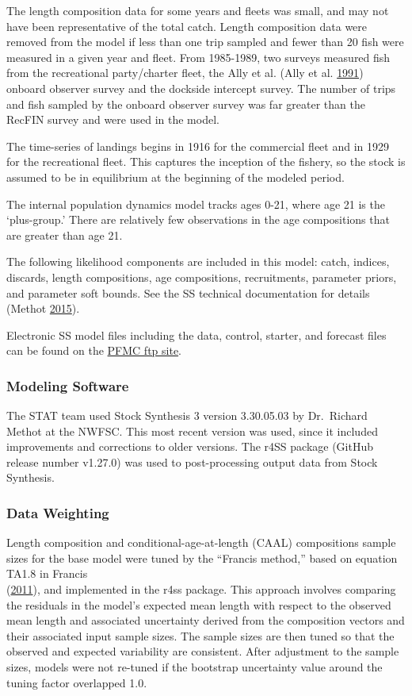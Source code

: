 \documentclass[12pt,]{article}
\begin{document}
The length composition data for some years and fleets was small, and may
not have been representative of the total catch. Length composition data
were removed from the model if less than one trip sampled and fewer than
20 fish were measured in a given year and fleet. From 1985-1989, two
surveys measured fish from the recreational party/charter fleet, the
Ally et al. (Ally et al. \protect\hyperlink{ref-Ally1991}{1991}) onboard
observer survey and the dockside intercept survey. The number of trips
and fish sampled by the onboard observer survey was far greater than the
RecFIN survey and were used in the model.

The time-series of landings begins in 1916 for the commercial fleet and
in 1929 for the recreational fleet. This captures the inception of the
fishery, so the stock is assumed to be in equilibrium at the beginning
of the modeled period.

The internal population dynamics model tracks ages 0-21, where age 21 is
the `plus-group.' There are relatively few observations in the age
compositions that are greater than age 21.

The following likelihood components are included in this model: catch,
indices, discards, length compositions, age compositions, recruitments,
parameter priors, and parameter soft bounds. See the SS technical
documentation for details (Methot
\protect\hyperlink{ref-Methot2015}{2015}).

Electronic SS model files including the data, control, starter, and
forecast files can be found on the
\href{ftp://ftp.pcouncil.org/pub/GF_STAR3_2017_Blue_Deacon_CAScorp/}{PFMC
ftp site}.

\subsubsection{Modeling Software}\label{modeling-software}

The STAT team used Stock Synthesis 3 version 3.30.05.03 by Dr.~Richard
Methot at the NWFSC. This most recent version was used, since it
included improvements and corrections to older versions. The r4SS
package (GitHub release number v1.27.0) was used to post-processing
output data from Stock Synthesis.

\subsubsection{Data Weighting}\label{data-weighting}

Length composition and conditional-age-at-length (CAAL) compositions
sample sizes for the base model were tuned by the ``Francis method,''
based on equation TA1.8 in Francis\\
(\protect\hyperlink{ref-Francis2011}{2011}), and implemented in the r4ss
package. This approach involves comparing the residuals in the model's
expected mean length with respect to the observed mean length and
associated uncertainty derived from the composition vectors and their
associated input sample sizes. The sample sizes are then tuned so that
the observed and expected variability are consistent. After adjustment
to the sample sizes, models were not re-tuned if the bootstrap
uncertainty value around the tuning factor overlapped 1.0.
\end{document}
